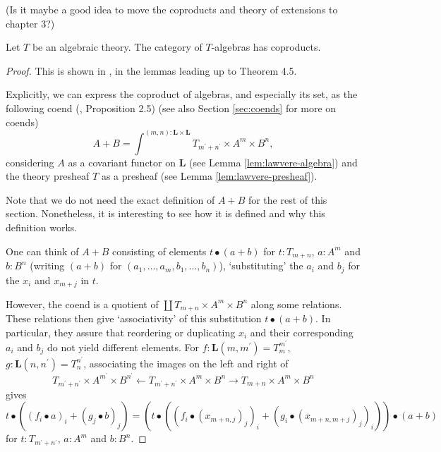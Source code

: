 (\TODO Is it maybe a good idea to move the coproducts and theory of extensions to chapter 3?)

\begin{lemma}\label{lem:algebra-coproducts}
  Let $ T $ be an algebraic theory. The category of $ T $-algebras has coproducts.
\end{lemma}
\begin{proof}
  This is shown in \autocite{algebraic-theories-2010}, in the lemmas leading up to Theorem 4.5.

  Explicitly, we can express the coproduct of algebras, and especially its set, as the following coend (\autocite{Hyland}, Proposition 2.5) (see also Section \ref{sec:coends} for more on coends)
  \[ A + B = \int^{(m, n) : \mathbf L \times \mathbf L} T_{m^\prime + n^\prime} \times A^m \times B^n, \]
  considering $ A $ as a covariant functor on $ \mathbf L $ (see Lemma \ref{lem:lawvere-algebra}) and the theory presheaf $ T $ as a presheaf (see Lemma \ref{lem:lawvere-presheaf}).

  Note that we do not need the exact definition of $ A + B $ for the rest of this section. Nonetheless, it is interesting to see how it is defined and why this definition works.

  One can think of $ A + B $ consisting of elements $ t \bullet (a + b) $ for $ t: T_{m + n} $, $ a : A^m $ and $ b: B^n $ (writing $ (a + b) $ for $ (a_1, \dots, a_m, b_1, \dots, b_n) $), `substituting' the $ a_i $ and $ b_j $ for the $ x_i $ and $ x_{m + j} $ in $ t $.

  However, the coend is a quotient of $ \coprod T_{m + n} \times A^m \times B^n $ along some relations. These relations then give `associativity' of this substitution $ t \bullet (a + b) $. In particular, they assure that reordering or duplicating $ x_i $ and their corresponding $ a_i $ and $ b_j $ do not yield different elements. For $ f: \mathbf L(m, m^\prime) = T_m^{m^\prime} $, $ g: \mathbf L(n, n^\prime) = T_n^{n^\prime} $, associating the images on the left and right of
  \[ T_{m^\prime + n^\prime} \times A^{m^\prime} \times B^{n^\prime} \leftarrow T_{m^\prime + n^\prime} \times A^m \times B^n \rightarrow T_{m + n} \times A^m \times B^n \]
  gives
  \[ t \bullet ((f_i \bullet a)_i + (g_j \bullet b)_j) = (t \bullet ((f_i \bullet (x_{m + n, j})_j)_i + (g_i \bullet (x_{m + n, m + j})_j)_i)) \bullet (a + b) \]
  for $ t : T_{m^\prime + n^\prime} $, $ a : A^m $ and $ b : B^n $.


\end{proof}
